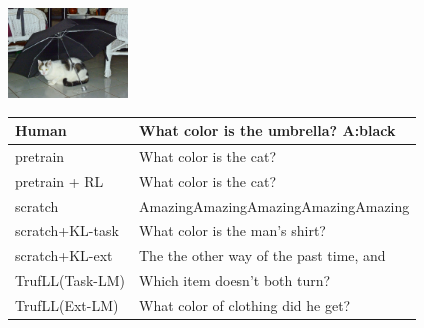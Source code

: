 \documentclass{article}
\newcommand{\algo}{TrufLL\xspace}
\begin{document}
\begin{table}[t!]
   \begin{minipage}{0.2\linewidth}
        \includegraphics[width=120px]{./COCO_val2014_000000216103.jpeg}
	\end{minipage}
	\hspace{1.2cm}
	\begin{minipage}{0.80\linewidth}
		\scriptsize
		\begin{tabular}{ll}
			Human           & What color is the umbrella?  \quad \textbf{A:black} \\
			\midrule
			pretrain        & What color is the cat? \\
		    pretrain + RL   & What color is the cat? \\ \midrule
			scratch         & AmazingAmazingAmazingAmazingAmazing  \\
			scratch+KL-task & What color is the man's shirt? \\
			scratch+KL-ext  & The the other way of the past time, and\\ \midrule
			\algo(Task-LM) & Which item doesn't both turn? \\
			\algo(Ext-LM)   & What color of clothing did he get? \\
			\bottomrule
		\end{tabular}
	\end{minipage}
	\vspace{1mm}


\end{table}
\end{document}
